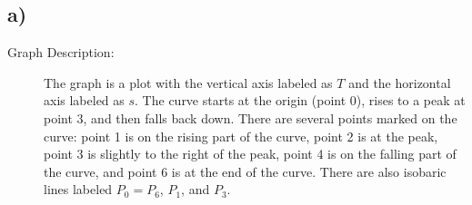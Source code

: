 

\subsection*{a)}

\begin{description}
    \item[Graph Description:] The graph is a plot with the vertical axis labeled as $T$ and the horizontal axis labeled as $s$. The curve starts at the origin (point 0), rises to a peak at point 3, and then falls back down. There are several points marked on the curve: point 1 is on the rising part of the curve, point 2 is at the peak, point 3 is slightly to the right of the peak, point 4 is on the falling part of the curve, and point 6 is at the end of the curve. There are also isobaric lines labeled $P_0 = P_6$, $P_1$, and $P_3$.
\end{description}
